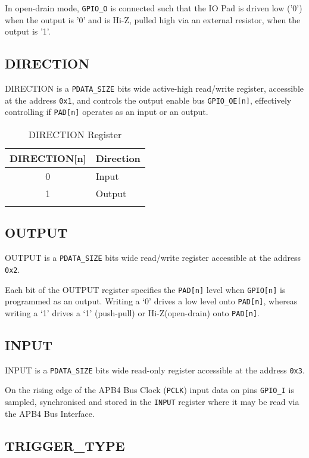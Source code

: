 In open-drain mode, \texttt{GPIO\_O} is connected such that the IO Pad is driven low ('0') when the output is '0' and is Hi-Z, pulled high via an external resistor, when the output is '1'.

\subsection{DIRECTION}\label{direction}

DIRECTION is a \texttt{PDATA\_SIZE} bits wide active-high read/write register, accessible at the address \texttt{0x1}, and controls the output enable bus \texttt{GPIO\_OE[n]}, effectively controlling if \texttt{PAD[n]} operates as an input or an output.

\begin{longtable}[]{@{}cl@{}}
\toprule
\textbf{DIRECTION[n]} & \textbf{Direction}\tabularnewline
\midrule
\endhead
0 & Input\tabularnewline
1 & Output\tabularnewline
\bottomrule
\caption{DIRECTION Register}
\end{longtable}

\subsection{OUTPUT}\label{output}

OUTPUT is a \texttt{PDATA\_SIZE} bits wide read/write register accessible at the address \texttt{0x2}.

Each bit of the OUTPUT register specifies the \texttt{PAD[n]} level when \texttt{GPIO[n]} is programmed as an output. Writing a ‘0’ drives a low level onto \texttt{PAD[n]}, whereas writing a ‘1’ drives a ‘1’ (push-pull) or Hi-Z(open-drain) onto \texttt{PAD[n]}.

\subsection{INPUT}\label{input}

INPUT is a \texttt{PDATA\_SIZE} bits wide read-only register accessible at the address \texttt{0x3}.

On the rising edge of the APB4 Bus Clock (\texttt{PCLK}) input data on pins
\texttt{GPIO\_I} is sampled, synchronised and stored in the \texttt{INPUT} register where it may be read via the APB4 Bus Interface.

\subsection{TRIGGER\_TYPE}\label{triggertype}

